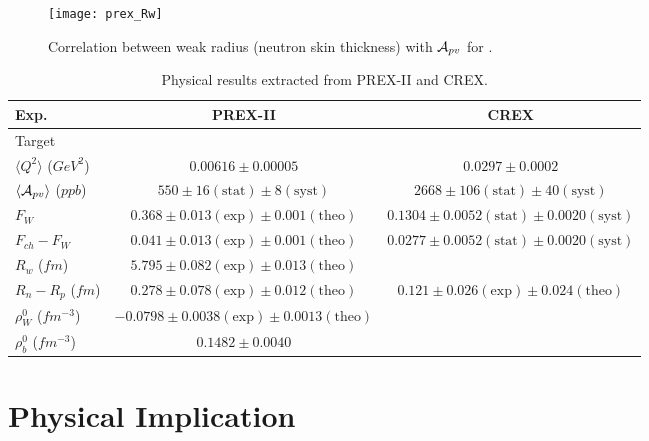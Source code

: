 \begin{figure}
    \centering
    \texttt{[image: prex\_Rw]}
    \caption{Correlation between weak radius (neutron skin thickness) with $\mathcal{A}_{pv}$ for \Pb.}
    \label{fig:prex_Rw}
\end{figure}

\begin{table}[!h]
    \centering
    \begin{tabular}{l | c c}
	\hline
	Exp.	& PREX-II   & CREX  \\
	\hline
	Target	& \Pb	    & \Ca   \\
	$\langle Q^2 \rangle $ ($GeV^2$)	& $ 0.00616 \pm 0.00005 $   & $0.0297 \pm 0.0002 $  \\
	$\langle \mathcal{A}_{pv} \rangle$ ($ppb$)   & $550 \pm 16 (\text{stat}) \pm 8 (\text{syst})$	& $2668 \pm 106 (\text{stat}) \pm 40 (\text{syst})$ \\
	$F_W$	& $0.368 \pm 0.013 (\text{exp}) \pm 0.001 (\text{theo})$    & $0.1304 \pm 0.0052 (\text{stat}) \pm 0.0020 (\text{syst})$    \\
	$F_{ch} - F_W$	& $0.041 \pm 0.013 (\text{exp}) \pm 0.001 (\text{theo})$    & $0.0277 \pm 0.0052 (\text{stat}) \pm 0.0020 (\text{syst})$    \\
	$R_w$ ($fm$)	& $5.795 \pm 0.082 (\text{exp}) \pm 0.013 (\text{theo})$    &	\\
	$R_n - R_p$ ($fm$)  & $0.278 \pm 0.078 (\text{exp}) \pm 0.012 (\text{theo})$	& $0.121 \pm 0.026 (\text{exp}) \pm 0.024 (\text{theo})$    \\
	$\rho_W^0$ ($fm^{-3}$)	& $-0.0798 \pm 0.0038 (\text{exp}) \pm 0.0013 (\text{theo})$	&   \\
	$\rho_b^0$ ($fm^{-3}$)	& $0.1482 \pm 0.0040 $	&   \\
	\hline
    \end{tabular}
    \caption{Physical results extracted from PREX-II and CREX.}
    \label{fig:pcrex_neutron_skin}
\end{table}
\section{Physical Implication}

